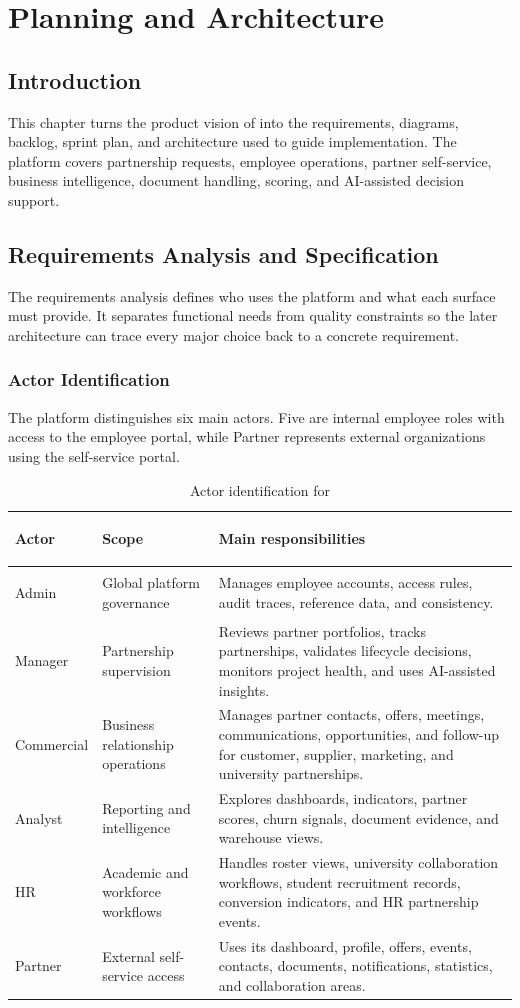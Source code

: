 \chapter{Planning and Architecture}
\section*{Introduction}
This chapter turns the product vision of \projectname{} into the requirements, diagrams, backlog, sprint plan, and architecture used to guide implementation. The platform covers partnership requests, employee operations, partner self-service, business intelligence, document handling, scoring, and AI-assisted decision support.
\section{Requirements Analysis and Specification}
The requirements analysis defines who uses the platform and what each surface must provide. It separates functional needs from quality constraints so the later architecture can trace every major choice back to a concrete requirement.
\subsection{Actor Identification}
The platform distinguishes six main actors. Five are internal employee roles with access to the employee portal, while Partner represents external organizations using the self-service portal.

\begin{table}[H]
  \centering
  \caption{Actor identification for \projectname{}}
  \begin{tabularx}{\textwidth}{>{\bfseries\raggedright\arraybackslash}p{2.7cm}>{\raggedright\arraybackslash}p{3.3cm}X}
    \toprule
    Actor & Scope & Main responsibilities \\
    \midrule
    Admin & Global platform governance & Manages employee accounts, access rules, audit traces, reference data, and consistency. \\
    Manager & Partnership supervision & Reviews partner portfolios, tracks partnerships, validates lifecycle decisions, monitors project health, and uses AI-assisted insights. \\
    Commercial & Business relationship operations & Manages partner contacts, offers, meetings, communications, opportunities, and follow-up for customer, supplier, marketing, and university partnerships. \\
    Analyst & Reporting and intelligence & Explores dashboards, indicators, partner scores, churn signals, document evidence, and warehouse views. \\
    HR & Academic and workforce workflows & Handles roster views, university collaboration workflows, student recruitment records, conversion indicators, and HR partnership events. \\
    Partner & External self-service access & Uses its dashboard, profile, offers, events, contacts, documents, notifications, statistics, and collaboration areas. \\
    \bottomrule
  \end{tabularx}
\end{table}
